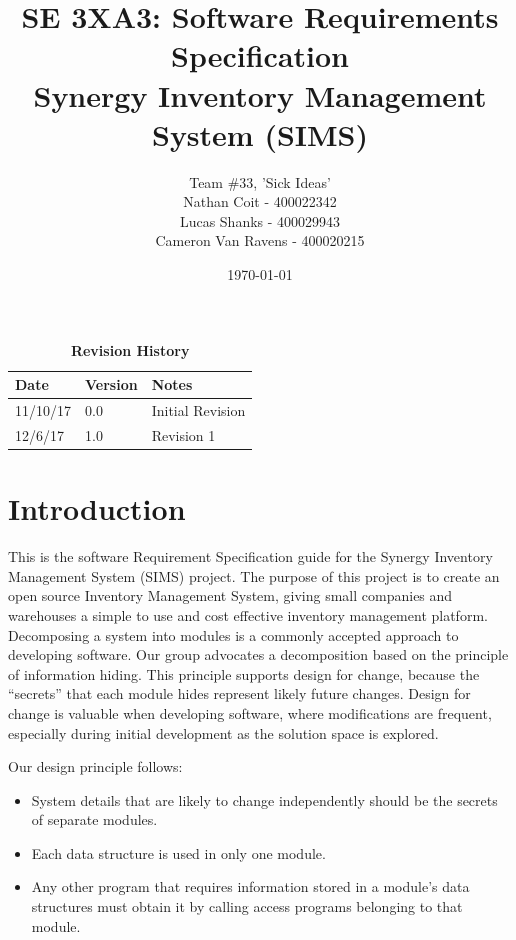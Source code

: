 \documentclass[12pt, titlepage]{article}
\title{SE 3XA3: Software Requirements Specification\\Synergy Inventory Management System (SIMS)}
\author{Team \#33, 'Sick Ideas'
		\\ Nathan Coit - 400022342
		\\ Lucas Shanks - 400029943
		\\ Cameron Van Ravens - 400020215
}
\date{\today}
\begin{document}
\maketitle

\tableofcontents
\listoftables
\listoffigures

\begin{table}[bp]
\caption{\bf Revision History}
\begin{tabularx}{\textwidth}{p{3cm}p{2cm}X}
\toprule {\bf Date} & {\bf Version} & {\bf Notes}\\
\midrule
11/10/17 & 0.0 & Initial Revision\\
12/6/17 & 1.0 & Revision 1\\
\bottomrule
\end{tabularx}
\end{table}

\newpage


\section{Introduction}

This is the software Requirement Specification guide for the Synergy Inventory Management System (SIMS) project. The purpose of this project is to create an open source Inventory Management System, giving small companies and warehouses a simple to use and cost effective inventory management platform.\\

Decomposing a system into modules is a commonly accepted approach to developing
software. Our group advocates a decomposition
based on the principle of information hiding. This
principle supports design for change, because the ``secrets'' that each module
hides represent likely future changes. Design for change is valuable when developing software,
where modifications are frequent, especially during initial development as the
solution space is explored.

Our design principle follows:
\begin{itemize}
\item System details that are likely to change independently should be the
  secrets of separate modules.
\item Each data structure is used in only one module.
\item Any other program that requires information stored in a module's data
  structures must obtain it by calling access programs belonging to that module.
\end{itemize}
\end{document}
